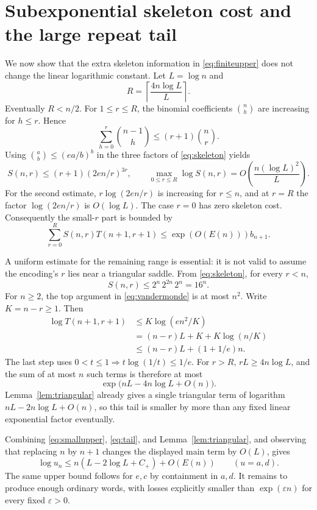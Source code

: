 \section{Subexponential skeleton cost and the large repeat tail}\label{sec:uppercost}
We now show that the extra skeleton information in \eqref{eq:finiteupper} does not change the linear logarithmic constant. Let $L=\log n$ and
\[
 R=\left\lceil\frac{4n\log L}{L}\right\rceil.
\]
Eventually $R<n/2$. For $1\le r\le R$, the binomial coefficients $\binom nh$ are increasing for $h\le r$. Hence
\[
 \sum_{h=0}^r\binom{n-1}{h}\le(r+1)\binom nr.
\]
Using $\binom ab\le(ea/b)^b$ in the three factors of \eqref{eq:skeleton} yields
\begin{equation}\label{eq:smallS}
 S(n,r)\le(r+1)(2en/r)^{3r},\qquad
 \max_{0\le r\le R}\log S(n,r)=O\!\left(\frac{n(\log L)^2}{L}\right).
\end{equation}
For the second estimate, $r\log(2en/r)$ is increasing for $r\le n$, and at $r=R$ the factor $\log(2en/r)$ is $O(\log L)$. The case $r=0$ has zero skeleton cost. Consequently the small-$r$ part is bounded by
\begin{equation}\label{eq:smallupper}
 \sum_{r=0}^R S(n,r)T(n+1,r+1)
 \le\exp(O(E(n)))b_{n+1}.
\end{equation}

A uniform estimate for the remaining range is essential: it is not valid to assume the encoding's $r$ lies near a triangular saddle. From \eqref{eq:skeleton}, for every $r<n$,
\[
 S(n,r)\le2^n\,2^{2n}\,2^n=16^n.
\]
For $n\ge2$, the top argument in \eqref{eq:vandermonde} is at most $n^2$. Write $K=n-r\ge1$. Then
\begin{align*}
 \log T(n+1,r+1)
 &\le K\log(en^2/K)\\
 &=(n-r)L+K+K\log(n/K)\\
 &\le(n-r)L+(1+1/e)n.
\end{align*}
The last step uses $0<t\le1\Rightarrow t\log(1/t)\le1/e$. For $r>R$, $rL\ge4n\log L$, and the sum of at most $n$ such terms is therefore at most
\begin{equation}\label{eq:tail}
 \exp\bigl(nL-4n\log L+O(n)\bigr).
\end{equation}
Lemma~\ref{lem:triangular} already gives a single triangular term of logarithm $nL-2n\log L+O(n)$, so this tail is smaller by more than any fixed linear exponential factor eventually.

Combining \eqref{eq:smallupper}, \eqref{eq:tail}, and Lemma~\ref{lem:triangular}, and observing that replacing $n$ by $n+1$ changes the displayed main term by $O(L)$, gives
\begin{equation}\label{eq:upperfinal}
 \log u_n\le n(L-2\log L+C_+)+O(E(n))
 \qquad(u=a,d).
\end{equation}
The same upper bound follows for $e,c$ by containment in $a,d$. It remains to produce enough ordinary words, with losses explicitly smaller than $\exp(\varepsilon n)$ for every fixed $\varepsilon>0$.

